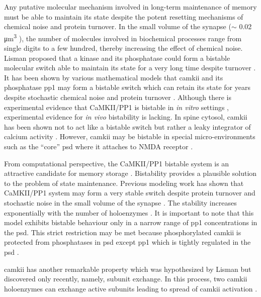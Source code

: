 \documentclass[9pt,lineno,doublespacing]{elife}
\begin{document}
Any putative molecular mechanism involved in long-term maintenance of memory
must be able to maintain its state despite the potent resetting mechanisms of
chemical noise and protein turnover.  In the small volume of the synapse ($\sim$
0.02 \si{\micro\meter^3} \citep{bartol_nanoconnectomic_2015}), the number of
molecules involved in biochemical processes range from single digits to a few
hundred, thereby increasing the effect of chemical noise.  Lisman proposed that
a kinase and its phosphatase could form a bistable molecular switch able to
maintain its state for a very long time despite turnover
\citep{lisman_mechanism_1985}. It has been shown by various mathematical models
that \gls{camkii} and its phosphatase \gls{pp1} may form a bistable switch
\citep{sandstorm_models_2004,zhabotinsky_bistability_2000} which can
retain its state for years despite stochastic chemical noise and protein
turnover \citep{miller_stability_2005}. Although there is experimental evidence
that CaMKII/PP1 is bistable in \emph{in vitro} settings
\citep{bradshaw_ultrasensitive_2003,urakubo_vitro_2014}, experimental
evidence for \emph{in vivo} bistability is lacking. In spine cytosol,
\gls{camkii} has been shown not to act like a bistable switch but rather a leaky
integrator of calcium activity \citep{chang_camkii_2017}.  However, \gls{camkii}
may be bistable in special micro-environments such as the ``core'' \gls{psd}
where it attaches to NMDA receptor \citep{dosemeci_postsynaptic_2016,petersen_distribution_2003}.

From computational perspective, the CaMKII/PP1 bistable system is an attractive
candidate for memory storage \citep{koch_biophysics_2004}.  Bistability provides
a plausible solution to the problem of state maintenance. Previous modeling work
has shown that CaMKII/PP1 system may form a very stable switch despite protein
turnover and stochastic noise in the small volume of the synapse
\citep{hayer_molecular_2005}. The stability increases exponentially with the
number of holoenzymes \citep{miller_stability_2005}. It is important to note that
this model exhibits bistable behaviour only in a narrow range of \gls{pp1}
concentrations in the \gls{psd}. This strict restriction may be met because
phosphorylated \gls{camkii} is protected from phosphatases in \gls{psd} except
\gls{pp1} \citep{strack_differential_1997} which is tightly regulated in the
\gls{psd} \citep{bollen_extended_2010}. 

\gls{camkii} has another remarkable property which was hypothesized by Lisman
\citep{lisman_cam_1994} but discovered only recently, namely, subunit exchange.
In this process, two \gls{camkii} holoenzymes can exchange active subunits
leading to spread of \gls{camkii} activation \citep{stratton_activation-triggered_2014}.
\end{document}
